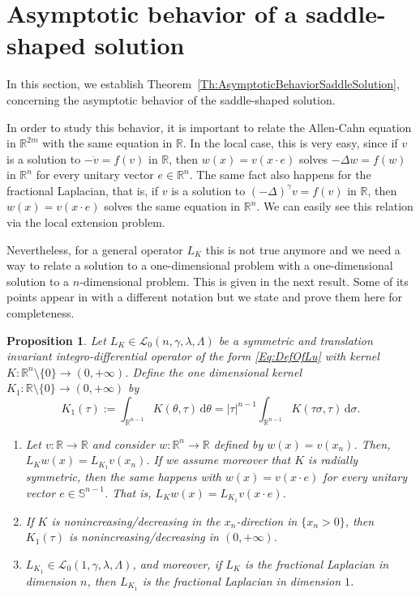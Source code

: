 \documentclass[12pt,reqno]{amsart}
\newtheorem{proposition}[theorem]{Proposition}
\theoremstyle{definition}
\theoremstyle{remark}
\newcommand{\con}[1]{\mathbb{#1}}
\newcommand{\R}{\con{R}} %
\newcommand{\Sph}{\con{S}} %
\newcommand{\s}{\gamma}
\newcommand{\fraclaplacian}{(-\Delta)^\s}
\renewcommand{\d}{\,\mathrm{d}} %
\numberwithin{equation}{section}
\begin{document}
\section{Asymptotic behavior of a saddle-shaped solution}
\label{Sec:Asymptotic}

In this section, we establish Theorem~\ref{Th:AsymptoticBehaviorSaddleSolution}, concerning the asymptotic behavior of the saddle-shaped solution. 



In order to study this behavior, it is important to relate the Allen-Cahn equation in $\R^{2m}$ with the same equation in $\R$. In the local case, this is very easy, since if $v$ is a solution to $-\ddot{v} = f(v)$ in $\R$,  then $w(x) = v(x\cdot e)$ solves $-\Delta w = f(w)$ in $\R^n$ for every unitary vector $e\in \R^n$. The same fact also happens for the fractional Laplacian, that is, if $v$ is a solution to $\fraclaplacian v = f(v)$ in $\R$, then $w(x)= v(x\cdot e)$ solves the same equation in $\R^n$. We can easily see this relation via the local extension problem.

Nevertheless, for a general operator $L_K$ this is not true anymore and we need a way to relate a solution to a one-dimensional problem with a one-dimensional solution to a $n$-dimensional problem. This is given in the next result. Some of its points appear in \cite{CozziPassalacqua} with a different notation but we state and prove them here for completeness.

\begin{proposition}
	\label{Prop:KernelsDimension}
	Let $L_K \in \mathcal{L}_0 (n,\s,\lambda,\Lambda)$ be a symmetric and translation invariant integro-differential operator of the form \eqref{Eq:DefOfLu} with kernel $K:\R^n\setminus \{0\} \to (0,+\infty) $. Define the one dimensional kernel $K_1 : \R \setminus \{0\} \to (0,+\infty) $ by
	\begin{equation}
	\label{Eq:OneDimKernel}
	K_1(\tau) := \int_{\R^{n-1}} K\left(\theta,\tau\right) \d \theta = |\tau|^{n-1} \int_{\R^{n-1}} K\left(\tau\sigma,\tau\right) \d \sigma.
	\end{equation}
	\begin{enumerate}[label=(\roman{*})]
		\item Let $v:\R\to\R$ and consider $w:\R^n\to\R$ defined by $w(x) = v(x_n)$. Then, $L_K w(x) = L_{K_1} v(x_n)$. If we assume moreover that $K$ is radially symmetric, then the same happens with $w(x) = v(x\cdot e)$ for every unitary vector $e\in \Sph^{n-1}$. That is, $L_K w(x) = L_{K_1} v(x \cdot e)$.
		\item  If $K$ is nonincreasing/decreasing in  the $x_n$-direction in $\{x_n>0\}$, then $K_1(\tau)$ is nonincreasing/decreasing in $(0,+\infty)$.
		\item $L_{K_1} \in \mathcal{L}_0 (1,\s,\lambda,\Lambda)$, and moreover, if $L_K $ is the fractional Laplacian in dimension $n$, then $L_{K_1}$ is the fractional Laplacian in dimension $1$.
		
	\end{enumerate}
\end{proposition}
\end{document}
